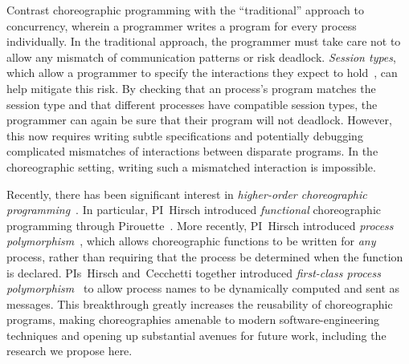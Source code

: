 Contrast choreographic programming with the ``traditional'' approach to concurrency, wherein a programmer writes a program for every process individually.
In the traditional approach, the programmer must take care not to allow any mismatch of communication patterns or risk deadlock.
\emph{Session types}, which allow a programmer to specify the interactions they expect to hold~\cite{DeYoungCPT09,CairesP10,GayV10,Wadler12,ScalasY19}, can help mitigate this risk.
By checking that an process's program matches the session type and that different processes have compatible session types, the programmer can again be sure that their program will not deadlock.
However, this now requires writing subtle specifications and potentially debugging complicated mismatches of interactions between disparate programs.
In the choreographic setting, writing such a mismatched interaction is impossible.

Recently, there has been significant interest in \emph{higher-order choreographic programming}~\cite{GraversenHM24,GiallorenzoMP23,CruzFilipeGLMP22,HirschG22,ShenKK23,SamuelsonHC25}.
In particular, PI~Hirsch introduced \emph{functional} choreographic programming through Pirouette~\cite{HirschG22}.
More recently, PI~Hirsch introduced \emph{process polymorphism}~\cite{GraversenHM24}, which allows choreographic functions to be written for \emph{any} process, rather than requiring that the process be determined when the function is declared.
PIs~Hirsch and~Cecchetti together introduced \emph{first-class process polymorphism}~\cite{SamuelsonHC25} to allow process names to be dynamically computed and sent as messages.
This breakthrough greatly increases the reusability of choreographic programs, making choreographies amenable to modern software-engineering techniques
and opening up substantial avenues for future work, including the research we propose here.


